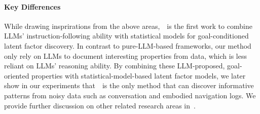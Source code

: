 \paragraph{Key Differences} While drawing insprirations from the above areas,~\ourmethod~is the first work to combine LLMs' instruction-following ability with statistical models for goal-conditioned latent factor discovery.
In contrast to pure-LLM-based frameworks, our method only rely on LLMs to document interesting properties from data, which is less reliant on LLMs' reasoning ability.
By combining these LLM-proposed, goal-oriented properties with statistical-model-based latent factor models, we later show in our experiments that~\ourmethod~is the only method that can discover informative patterns from noisy data such as conversation and embodied navigation logs.
We provide further discussion on other related research areas in~.